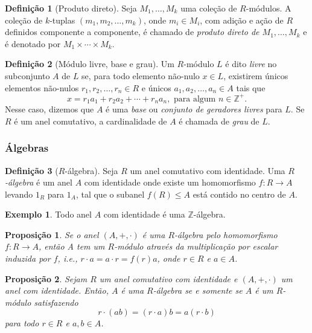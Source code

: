 \documentclass[a4paper,12pt]{report}
\theoremstyle{plain}
\newtheorem{proposicao}{Proposição}[section]
\theoremstyle{definition}
\newtheorem{definicao}{Definição}[section]
\newtheorem{exemplo}{Exemplo}[section]
\begin{document}
\begin{definicao}[Produto direto]
	Seja $M_1,\dots,M_k$ uma coleção de $R$-módulos. A coleção de $k$-tuplas $(m_1,m_2,\dots,m_k)$, onde $m_i\in M_i$, com adição e ação de $R$ definidos componente a componente, é chamado de \emph{produto direto de $M_1,\dots,M_k$} e é denotado por $M_1\times\cdots\times M_k$.
\end{definicao}

\begin{definicao}[Módulo livre, base e grau]
	Um $R$-módulo $L$ é dito \emph{livre} no subconjunto $A$ de $L$ se, para todo elemento não-nulo $x\in L$, existirem únicos elementos não-nulos $r_1,r_2,\dots,r_n\in R$ e únicos $a_1,a_2,\dots,a_n\in A$ tais que $$x = r_1a_1 + r_2a_2 + \cdots + r_na_n, \text{ para algum $n \in \mathbb{Z}^+$}.$$ Nesse caso, dizemos que $A$ é uma \emph{base} ou \emph{conjunto de geradores livres} para $L$. Se $R$ é um anel comutativo, a cardinalidade de $A$ é chamada de \emph{grau} de $L$.
\end{definicao}

\subsubsection{Álgebras}

\begin{definicao}[$R$-álgebra]
	Seja $R$ um anel comutativo com identidade. Uma \emph{$R$-álgebra} é um anel $A$ com identidade onde existe um homomorfismo $f:R\longrightarrow A$ levando $1_R$ para $1_A$, tal que o subanel $f(R) \leq A$ está contido no centro de $A$.
\end{definicao}

\begin{exemplo}
	Todo anel $A$ com identidade é uma $\mathbb{Z}$-álgebra. 
\end{exemplo}

\begin{proposicao}
	Se o anel $(A,+,\cdot)$ é uma $R$-álgebra pelo homomorfismo $f:R\longrightarrow A$, então A tem um $R$-módulo através da multiplicação por escalar induzida por $f$, i.e., $r\cdot a = a\cdot r = f(r)a$, onde $r\in R$ e $a\in A$.
\end{proposicao}

\begin{proposicao}
	Sejam $R$ um anel comutativo com identidade e $(A, +, \cdot)$ um anel com identidade. Então, $A$ é uma $R$-álgebra se e somente se $A$ é um $R$-módulo satisfazendo $$r\cdot (ab) = (r\cdot a)b = a(r\cdot b)$$ para todo $r\in R$ e $a,b \in A$.
\end{proposicao}
\end{document}
